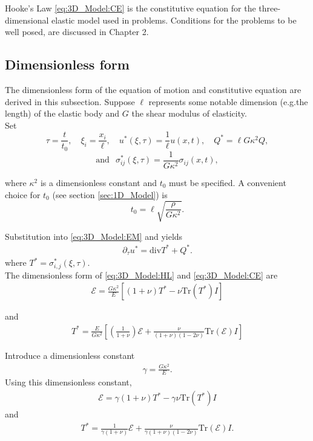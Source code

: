 \documentclass[../../main.tex]{subfiles}
\begin{document}
Hooke's Law \eqref{eq:3D_Model:CE} is the constitutive equation for the
three-dimensional elastic model used in problems. Conditions for the problems
to be well posed, are discussed in Chapter 2.

\subsection{Dimensionless form} \label{ssec:3D_Model:DimensionlessForm}
The dimensionless form of the equation of motion and constitutive equation are
derived in this subsection. Suppose $\ell$ represents some notable dimension
(e.g.the length) of the elastic body and $G$ the shear modulus of elasticity.\\

Set \[\tau = \frac{t}{t_0},\quad \xi_i = \frac{x_i}{\ell},\quad {u}^*(\xi,\tau) = \frac{1}{\ell}{u}(x,t), \quad Q^{*} = \ell G \kappa^2 Q, \]
\[ \text{and} \ \,\,\, \sigma_{ij}^*(\xi,\tau) = \frac{1}{G\kappa^2}\sigma_{ij}(x,t),\]

where $\kappa^2$ is a dimensionless constant and $t_0$ must be specified. A
convenient choice for $t_0$ (see section \ref{sec:1D_Model}) is \[t_0 = \ell\sqrt{\frac{\rho}{G\kappa^2}}.\]

Substitution into \eqref{eq:3D_Model:EM} and yields
\begin{eqnarray*}
	\partial_{\tau} u^{*} = \textrm{div}T^* + Q^*.
\end{eqnarray*}
where $T^* = \sigma_{i,j}^*(\xi,\tau)$.\\

The dimensionless form of \eqref{eq:3D_Model:HL} and \eqref{eq:3D_Model:CE} are
\begin{eqnarray*}
	\mathcal{E} = \frac{G \kappa^2}{E} \left[ (1+\nu)T^* - \nu \textrm{Tr}(T^*)I \right]
\end{eqnarray*}

and
\begin{eqnarray*}
	T^* = \frac{E}{G \kappa^2} \left[\left( \frac{1}{1+\nu} \right)\mathcal{E} + \frac{\nu}{(1+\nu)(1-2\nu)}\textrm{Tr}(\mathcal{E})I \right]
\end{eqnarray*}

Introduce a dimensionless constant
\begin{eqnarray*}
	\gamma= \frac{G\kappa^2}{E}.
\end{eqnarray*} Using this dimensionless constant,
\begin{eqnarray}
	\mathcal{E} = \gamma(1+\nu)T^* - \gamma\nu \textrm{Tr}(T^*)I \label{DM_H_E}
\end{eqnarray}
and
\begin{eqnarray}
	T^* = \frac{1}{\gamma(1+\nu)}\mathcal{E} + \frac{\nu}{\gamma(1+\nu)(1-2\nu)}\textrm{Tr}(\mathcal{E})I. \label{DM_H_T}
\end{eqnarray}
\end{document}
